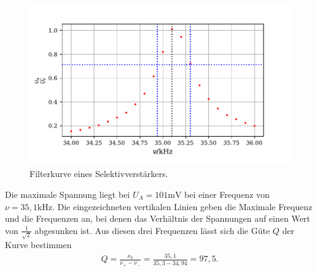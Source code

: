 \begin{figure}[H]
  \centering
  \includegraphics{plot1.pdf}
  \caption{Filterkurve eines Selektivverstärkers. }
  \label{fig:plot}
\end{figure}

Die maximale Spannung liegt bei $U_A = 101\si{\milli\volt}$ bei einer Frequenz von $\nu = 35,1\si{\kilo\hertz}$.
Die eingezeichneten vertikalen Linien geben die Maximale Frequenz und die Frequenzen an, bei denen das Verhältnis der Spannungen auf einen Wert von $\frac{1}{\sqrt{2}}$ abgesunken ist.
Aus diesen drei Frequenzen lässt sich die Güte $Q$ der Kurve bestimmen
\begin{align*}
Q = \frac{\nu_0}{\nu_+ - \nu_-} = \frac{35,1}{35,3 - 34,94} = 97,5.
\end{align*}



